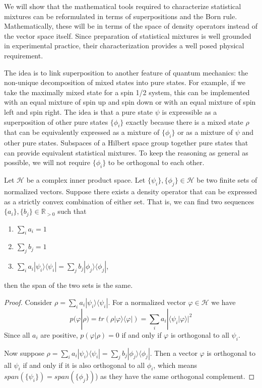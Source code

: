 \documentclass[10pt,twocolumn, nofootinbib]{revtex4-2}
\def\>{\rangle}
\def\<{\langle}
\begin{document}
We will show that the mathematical tools required to characterize statistical mixtures can be reformulated in terms of superpositions and the Born rule. Mathematically, these will be in terms of the space of density operators instead of the vector space itself. Since preparation of statistical mixtures is well grounded in experimental practice, their characterization provides a well posed physical requirement.

The idea is to link superposition to another feature of quantum mechanics: the non-unique decomposition of mixed states into pure states. For example, if we take the maximally mixed state for a spin 1/2 system, this can be implemented with an equal mixture of spin up and spin down or with an equal mixture of spin left and spin right. The idea is that a pure state $\psi$ is expressible as a superposition of other pure states $\{\phi_i\}$ exactly because there is a mixed state $\rho$ that can be equivalently expressed as a mixture of $\{\phi_i\}$ or as a mixture of $\psi$ and other pure states. Subspaces of a Hilbert space group together pure states that can provide equivalent statistical mixtures. To keep the reasoning as general as possible, we will not require $\{\phi_i\}$ to be orthogonal to each other.

\begin{prop}\label{prop_densitySpan}
Let $\mathcal{H}$ be a complex inner product space. Let $\{\psi_i\}, \{\phi_j\} \in \mathcal{H}$ be two finite sets of normalized vectors. Suppose there exists a density operator that can be expressed as a strictly convex combination of either set. That is, we can find two sequences $\{a_i\}, \{b_j\} \in \mathbb{R}_{>0}$ such that
\begin{enumerate}
\item $\sum_i a_i = 1$
\item $\sum_j b_j = 1$
\item $\sum_i a_i |\psi_i\>\<\psi_i| = \sum_j b_j |\phi_j\>\<\phi_j|$,
\end{enumerate}
then the span of the two sets is the same.
\end{prop}

\begin{proof}
Consider $\rho = \sum_i a_i |\psi_i\>\<\psi_i|$. For a normalized vector $\varphi \in \mathcal{H}$ we have
$$p(\varphi|\rho)=tr(\rho |\varphi\>\<\varphi|) = \sum_i a_i |\<\psi_i|\varphi\>|^2$$
Since all $a_i$ are positive, $p(\varphi|\rho) = 0$ if and only if $\varphi$ is orthogonal to all $\psi_i$.

Now suppose $\rho = \sum_i a_i |\psi_i\>\<\psi_i| = \sum_j b_j |\phi_j\>\<\phi_j|$. Then a vector $\varphi$ is orthogonal to all $\psi_i$ if and only if it is also orthogonal to all $\phi_i$, which means $span(\{\psi_i\}) = span(\{\phi_j\})$) as they have the same orthogonal complement.
\end{proof}
\end{document}
